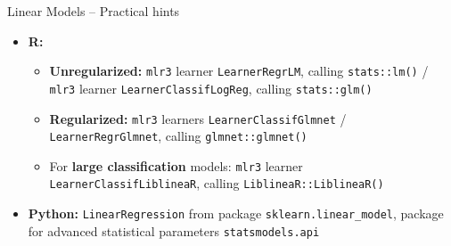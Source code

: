 \begin{frame}{Linear Models -- Practical hints}


\begin{itemize}
  \item \textbf{R:}
  \begin{itemize}
    \item \textbf{Unregularized:} \texttt{mlr3} learner \texttt{LearnerRegrLM}, 
    calling \texttt{stats::lm()} / \texttt{mlr3} learner 
    \texttt{LearnerClassifLogReg}, calling \texttt{stats::glm()}
    \item \textbf{Regularized:} \texttt{mlr3} learners 
    \texttt{LearnerClassifGlmnet} / 
    \texttt{LearnerRegrGlmnet}, calling \texttt{glmnet::glmnet()}
    \item For \textbf{large classification} models: \texttt{mlr3} learner     
    \texttt{LearnerClassifLiblineaR}, calling \texttt{LiblineaR::LiblineaR()}
  \end{itemize}
  \item \textbf{Python:} \texttt{LinearRegression} from package 
  \texttt{sklearn.linear\_model}, package for advanced statistical parameters 
  \texttt{statsmodels.api} 
\end{itemize}


\end{frame}